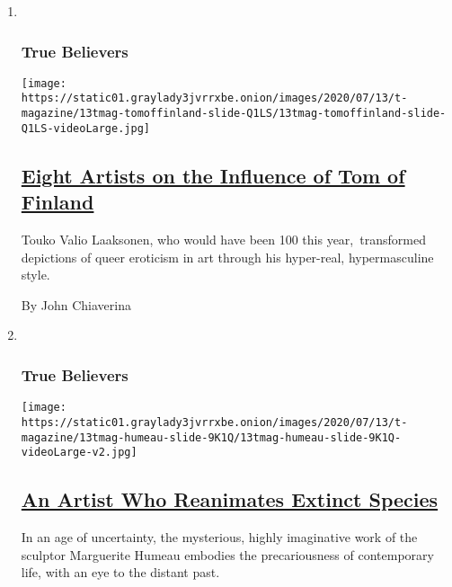 \begin{enumerate}
\def\labelenumi{\arabic{enumi}.}
\item ~
  \hypertarget{true-believers-4}{%
  \subsubsection{True Believers}\label{true-believers-4}}

  \texttt{[image: https://static01.graylady3jvrrxbe.onion/images/2020/07/13/t-magazine/13tmag-tomoffinland-slide-Q1LS/13tmag-tomoffinland-slide-Q1LS-videoLarge.jpg]}

  \hypertarget{eight-artists-on-the-influence-of-tom-of-finland}{%
  \subsection{\texorpdfstring{\href{/2020/07/23/t-magazine/tom-of-finland.html}{Eight
  Artists on the Influence of Tom of
  Finland}}{Eight Artists on the Influence of Tom of Finland}}\label{eight-artists-on-the-influence-of-tom-of-finland}}

  Touko Valio Laaksonen, who would have been 100 this year,~transformed
  depictions of queer eroticism in art through his hyper-real,
  hypermasculine style.

  By John Chiaverina
\item ~
  \hypertarget{true-believers-5}{%
  \subsubsection{True Believers}\label{true-believers-5}}

  \texttt{[image: https://static01.graylady3jvrrxbe.onion/images/2020/07/13/t-magazine/13tmag-humeau-slide-9K1Q/13tmag-humeau-slide-9K1Q-videoLarge-v2.jpg]}

  \hypertarget{an-artist-who-reanimates-extinct-species}{%
  \subsection{\texorpdfstring{\href{/2020/07/23/t-magazine/marguerite-humeau.html}{An
  Artist Who Reanimates Extinct
  Species}}{An Artist Who Reanimates Extinct Species}}\label{an-artist-who-reanimates-extinct-species}}

  In an age of uncertainty, the mysterious, highly imaginative work of
  the sculptor Marguerite Humeau embodies the precariousness of
  contemporary life, with an eye to the distant past.


\end{enumerate}
